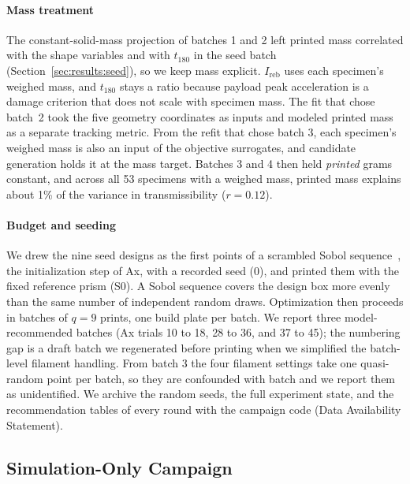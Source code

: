 \documentclass[11pt]{article}
\begin{document}
\paragraph{Mass treatment} The constant-solid-mass projection of batches
1 and 2 left printed mass correlated with the shape variables and with
$t_{180}$ in the seed batch (Section~\ref{sec:results:seed}), so we keep
mass explicit. $I_{\mathrm{reb}}$ uses each specimen's weighed mass, and
$t_{180}$ stays a ratio because payload peak acceleration is a damage
criterion that does not scale with specimen mass. The fit that chose
batch~2 took the five geometry coordinates as inputs and modeled printed
mass as a separate tracking metric. From the refit that chose batch 3,
each specimen's weighed mass is also an input of the objective
surrogates, and candidate generation holds it at the mass target.
Batches 3 and 4 then held \emph{printed} grams constant, and across all
53 specimens with a weighed mass, printed mass explains about 1\% of the variance in
transmissibility ($r = 0.12$).

\paragraph{Budget and seeding} We drew the nine seed designs as the
first points of a scrambled Sobol sequence~\citep{sobol1967distribution,
owen1998scrambling}, the initialization step of Ax, with a recorded seed
(0), and printed them with the fixed reference prism (S0). A Sobol
sequence covers the design box more evenly than the same number of
independent random draws. Optimization then proceeds in batches of
$q = 9$ prints, one build plate per batch. We report three
model-recommended batches (Ax trials 10 to 18, 28 to 36, and 37 to 45);
the numbering gap is a draft batch we regenerated before printing when
we simplified the batch-level filament handling. From batch 3 the four
filament settings take one quasi-random point per batch, so they are
confounded with batch and we report them as unidentified. We archive
the random seeds, the full experiment state, and the recommendation
tables of every round with the campaign code (Data Availability
Statement).

\subsection{Simulation-Only Campaign}
\label{sec:methods:sim}
\end{document}
